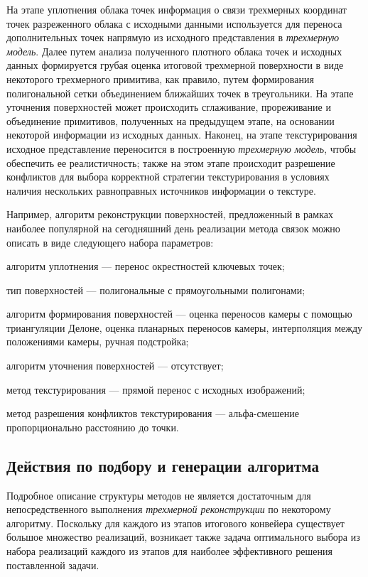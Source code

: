 На этапе уплотнения облака точек информация о связи трехмерных координат точек разреженного облака с исходными данными используется для переноса дополнительных точек напрямую из исходного представления в \textit{трехмерную модель}. Далее путем анализа полученного плотного облака точек и исходных данных формируется грубая оценка итоговой трехмерной поверхности в виде некоторого трехмерного примитива, как правило, путем формирования полигональной сетки объединением ближайших точек в треугольники. На этапе уточнения поверхностей может происходить сглаживание, прореживание и объединение примитивов, полученных на предыдущем этапе, на основании некоторой информации из исходных данных. Наконец, на этапе текстурирования исходное представление переносится в построенную \textit{трехмерную модель}, чтобы обеспечить ее реалистичность; также на этом этапе происходит разрешение конфликтов для выбора корректной стратегии текстурирования в условиях наличия нескольких равноправных источников информации о текстуре.

Например, алгоритм реконструкции поверхностей, предложенный в рамках наиболее популярной на сегодняшний день реализации метода связок можно описать в виде следующего набора параметров:
\begin{textitemize}
    \item алгоритм уплотнения --- перенос окрестностей ключевых точек;
    \item тип поверхностей --- полигональные с прямоугольными полигонами;
    \item алгоритм формирования поверхностей --- оценка переносов камеры с помощью триангуляции Делоне, оценка планарных переносов камеры, интерполяция между положениями камеры, ручная подстройка;
    \item алгоритм уточнения поверхностей --- отсутствует;
    \item метод текстурирования --- прямой перенос с исходных изображений;
    \item метод разрешения конфликтов текстурирования --- альфа-смешение пропорционально расстоянию до точки.
\end{textitemize}

\subsection{Действия по подбору и генерации алгоритма}
\label{sec_3d_models_actions_gen}

Подробное описание структуры методов не является достаточным для непосредственного выполнения \textit{трехмерной реконструкции} по некоторому алгоритму. Поскольку для каждого из этапов итогового конвейера существует большое множество реализаций, возникает также задача оптимального выбора из набора реализаций каждого из этапов для наиболее эффективного решения поставленной задачи.

